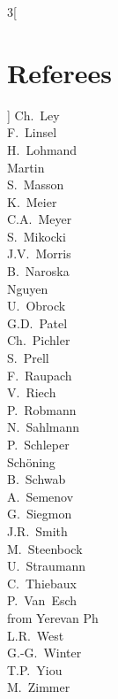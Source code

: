 \documentclass{llncs}
\begin{document}
\begin{multicols}{3}[\section*{Referees}]
Ch.~Ley\\
F.~Linsel\\
H.~Lohmand\\
Martin\\
S.~Masson\\
K.~Meier\\
C.A.~Meyer\\
S.~Mikocki\\
J.V.~Morris\\
B.~Naroska\\
Nguyen\\
U.~Obrock\\
G.D.~Patel\\
Ch.~Pichler\\
S.~Prell\\
F.~Raupach\\
V.~Riech\\
P.~Robmann\\
N.~Sahlmann\\
P.~Schleper\\
Sch\"oning\\
B.~Schwab\\
A.~Semenov\\
G.~Siegmon\\
J.R.~Smith\\
M.~Steenbock\\
U.~Straumann\\
C.~Thiebaux\\
P.~Van~Esch\\
from Yerevan Ph\\
L.R.~West\\
G.-G.~Winter\\
T.P.~Yiou\\
M.~Zimmer\end{multicols}
%
\end{document}
